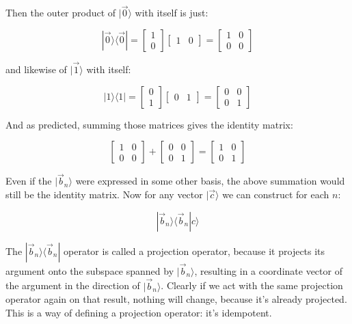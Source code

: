 Then the outer product of $|\vec{0} \rangle$ with itself is just:

$$
|\vec{0} \rangle \langle \vec{0}| = 
\begin{bmatrix} 1 \\ 0 \end{bmatrix}
\begin{bmatrix} 1 & 0 \end{bmatrix} =
\begin{bmatrix} 1 & 0 \\ 0 & 0 \end{bmatrix}
$$

and likewise of $|\vec{1} \rangle$ with itself:

$$
|1 \rangle \langle 1| = 
\begin{bmatrix} 0 \\ 1 \end{bmatrix}
\begin{bmatrix} 0 & 1 \end{bmatrix} =
\begin{bmatrix} 0 & 0 \\ 0 & 1 \end{bmatrix}
$$

And as predicted, summing those matrices gives the identity matrix:

$$
\begin{bmatrix} 1 & 0 \\ 0 & 0 \end{bmatrix} +
\begin{bmatrix} 0 & 0 \\ 0 & 1 \end{bmatrix} =
\begin{bmatrix} 1 & 0 \\ 0 & 1 \end{bmatrix}
$$

Even if the $|\vec{b}_n \rangle$ were expressed in some other basis, the above summation would still be the identity matrix. Now for any vector $|\vec{c} \rangle$ we can construct for each $n$:

$$|\vec{b}_n \rangle \langle \vec{b}_n | c \rangle$$

The $|\vec{b}_n \rangle \langle \vec{b}_n|$ operator is called a projection operator, because it projects its argument onto the subspace spanned by $|\vec{b}_n \rangle$, resulting in a coordinate vector of the argument in the direction of $|\vec{b}_n \rangle$. Clearly if we act with the same projection operator again on that result, nothing will change, because it's already projected. This is a way of defining a projection operator: it's idempotent.


